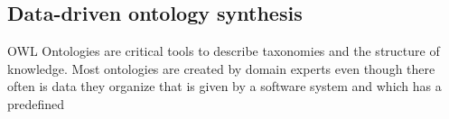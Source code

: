 																																																																																																																																																																																																																																																																																																																																																																																																																																																																																																																																																			\subsection{Data-driven ontology synthesis}
																																																																																																																																																																																																																																																																																																																																																																																																																																																																																																																																																			OWL Ontologies are critical tools to describe taxonomies and the
																																																																																																																																																																																																																																																																																																																																																																																																																																																																																																																																																			structure of knowledge.
																																																																																																																																																																																																																																																																																																																																																																																																																																																																																																																																																			Most ontologies are created by domain experts even though there often is data they
																																																																																																																																																																																																																																																																																																																																																																																																																																																																																																																																																			organize that is given by a software system and which has a predefined
